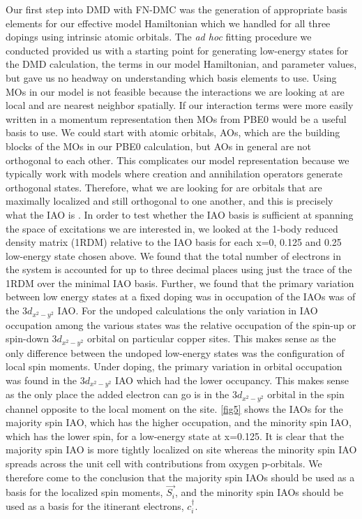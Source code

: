 \documentclass{article}
\begin{document}
Our first step into DMD with FN-DMC was the generation of appropriate basis elements for our effective model Hamiltonian which we handled for all three dopings using intrinsic atomic orbitals. 
The \textit{ad hoc} fitting procedure we conducted provided us with a starting point for generating low-energy states for the DMD calculation, the terms in our model Hamiltonian, and parameter values, but gave us no headway on understanding which basis elements to use.
Using MOs in our model is not feasible because the interactions we are looking at are local and are nearest neighbor spatially. 
If our interaction terms were more easily written in a momentum representation then MOs from PBE0 would be a useful basis to use. 
We could start with atomic orbitals, AOs, which are the building blocks of the MOs in our PBE0 calculation, but AOs in general are not orthogonal to each other. 
This complicates our model representation because we typically work with models where creation and annihilation operators generate orthogonal states. 
Therefore, what we are looking for are orbitals that are maximally localized and still orthogonal to one another, and this is precisely what the IAO is \cite{doi:10.1021/ct400687b}. 
In order to test whether the IAO basis is sufficient at spanning the space of excitations we are interested in, we looked at the 1-body reduced density matrix (1RDM) relative to the IAO basis for each x=0, 0.125 and 0.25 low-energy state chosen above. 
We found that the total number of electrons in the system is accounted for up to three decimal places using just the trace of the 1RDM over the minimal IAO basis. 
Further, we found that the primary variation between low energy states at a fixed doping was in occupation of the IAOs was of the 3$d_{x^2-y^2}$ IAO. 
For the undoped calculations the only variation in IAO occupation among the various states was the relative occupation of the spin-up or spin-down 3$d_{x^2-y^2}$ orbital on particular copper sites. 
This makes sense as the only difference between the undoped low-energy states was the configuration of local spin moments. 
Under doping, the primary variation in orbital occupation was found in the 3$d_{x^2-y^2}$ IAO which had the lower occupancy.
This makes sense as the only place the added electron can go is in the 3$d_{x^2-y^2}$ orbital in the spin channel opposite to the local moment on the site. 
\ref{fig5} shows the IAOs for the majority spin IAO, which has the higher occupation, and the minority spin IAO, which has the lower spin, for a low-energy state at x=0.125. 
It is clear that the majority spin IAO is more tightly localized on site whereas the minority spin IAO spreads across the unit cell with contributions from oxygen p-orbitals. 
We therefore come to the conclusion that the majority spin IAOs should be used as a basis for the localized spin moments, $\vec{S_i}$, and the minority spin IAOs should be used as a basis for the itinerant electrons, $c_i^\dagger$. 
\end{document}
